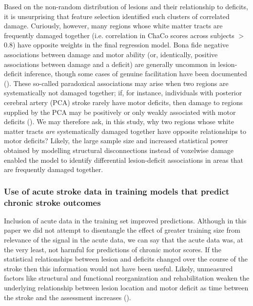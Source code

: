 \documentclass[10pt]{article}
\begin{document}
Based on the non-random distribution of lesions and their relationship to deficits, it is unsurprising that feature selection identified such clusters of correlated damage. Curiously, however, many regions whose white matter tracts are frequently damaged together (i.e. correlation in ChaCo scores across subjects $>$0.8) have opposite weights in the final regression model. Bona fide negative associations between damage and motor ability (or, identically, positive associations between damage and a deficit) are generally uncommon in lesion-deficit inference, though some cases of genuine facilitation have been documented (\cite{Kapur1996-xq, Sperber2020-kp}). These so-called paradoxical associations may arise when two regions are systematically not damaged together; if, for instance, individuals with posterior cerebral artery (PCA) stroke rarely have motor deficits, then damage to regions supplied by the PCA may be positively or only weakly associated with motor deficits (\cite{Sperber2020-kp}). We may therefore ask, in this study, why two regions whose white matter tracts \textit{are} systematically damaged together have opposite relationships to motor deficits? Likely, the large sample size and increased statistical power obtained by modelling structural disconnections instead of voxelwise damage enabled the model to identify differential lesion-deficit associations in areas that are frequently damaged together.


\subsubsection*{Use of acute stroke data in training models that predict chronic stroke outcomes}
Inclusion of acute data in the training set improved predictions. Although in this paper we did not attempt to disentangle the effect of greater training size from relevance of the signal in the acute data, we can say that the acute data was, at the very least, not harmful for predictions of chronic motor scores. If the statistical relationships between lesion and deficits changed over the course of the stroke then this information would not have been useful. Likely, unmeasured factors like structural and functional reorganization and rehabilitation weaken the underlying relationship between lesion location and motor deficit as time between the stroke and the assessment increases (\cite{Shahid2017-gx}). 
\end{document}
